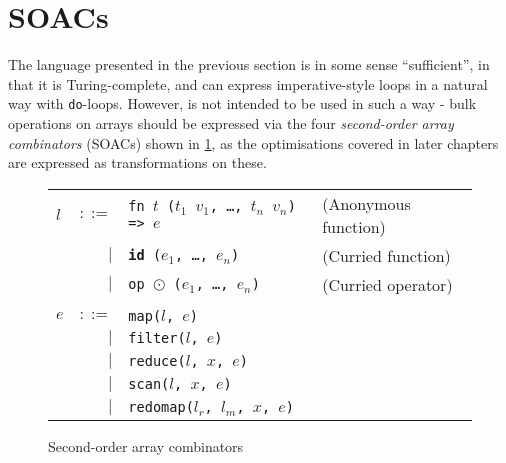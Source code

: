 \section{SOACs}
\label{sec:soacs}

The language presented in the previous section is in some sense
``sufficient'', in that it is Turing-complete, and can express
imperative-style loops in a natural way with \texttt{do}-loops.
However, \LO{} is not intended to be used in such a way - bulk
operations on arrays should be expressed via the four
\textit{second-order array combinators} (SOACs) shown in
\cref{fig:soacs}, as the optimisations covered in later chapters are
expressed as transformations on these.

\begin{figure}[bt]
\begin{tabular}{lrll}
$l$ & $::=$ & \texttt{fn $t$ ($t_{1}$ $v_{1}$, \ldots, $t_{n}$ $v_{n}$) => $e$} & (Anonymous function) \\
& $|$ & \texttt{\textbf{id} ($e_{1}$, \ldots, $e_{n}$)} & (Curried function) \\
& $|$ & \texttt{op $\odot$ ($e_{1}$, \ldots, $e_{n}$)} & (Curried operator) \\
\\
$e$ & $::=$ & \texttt{map($l$, $e$)} \\
    & $|$ & \texttt{filter($l$, $e$)} \\
    & $|$ & \texttt{reduce($l$, $x$, $e$)} \\
    & $|$ & \texttt{scan($l$, $x$, $e$)} \\
    & $|$ & \texttt{redomap($l_{r}$, $l_{m}$, $x$, $e$)} \\
\end{tabular}
\caption{Second-order array combinators}
\label{fig:soacs}
\end{figure}

